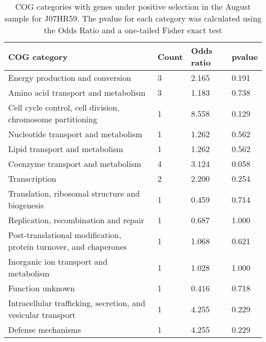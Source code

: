 \begin{table}[hb]
\footnotesize 
	\tabcolsep=0.11cm 
\caption{COG categories with genes under positive selection in the August sample for J07HR59. The pvalue for each category was calculated using the Odds Ratio and a one-tailed Fisher exact test} 
\begin{tabularx}{\textwidth}{L{6cm}R{2cm}R{2cm}R{2cm}} 
\hline 
\textbf{COG category} & \textbf{Count} & \textbf{Odds ratio} & \textbf{pvalue} \\ 
\hline 
Energy production and conversion & 3 & 2.165 & 0.191 \\ 
Amino acid transport and metabolism & 3 & 1.183 & 0.738 \\ 
Cell cycle control, cell division, chromosome partitioning & 1 & 8.558 & 0.129 \\ 
Nucleotide transport and metabolism & 1 & 1.262 & 0.562 \\ 
Lipid transport and metabolism & 1 & 1.262 & 0.562 \\ 
Coenzyme transport and metabolism & 4 & 3.124 & 0.058 \\ 
Transcription & 2 & 2.200 & 0.254 \\ 
Translation, ribosomal structure and biogenesis & 1 & 0.459 & 0.714 \\ 
Replication, recombination and repair & 1 & 0.687 & 1.000 \\ 
Post-translational modification, protein turnover, and chaperones & 1 & 1.068 & 0.621 \\ 
Inorganic ion transport and metabolism & 1 & 1.028 & 1.000 \\ 
Function unknown & 1 & 0.416 & 0.718 \\ 
Intracellular trafficking, secretion, and vesicular transport & 1 & 4.255 & 0.229 \\ 
Defense mechanisms & 1 & 4.255 & 0.229 \\ 
\end{tabularx} 
\label{August_COG_Selection_J07HR59} 
 \end{table} 

